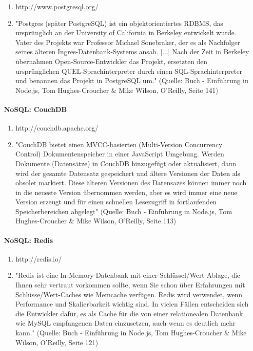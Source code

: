 \begin{enumerate}
\item http://www.postgresql.org/
\item "Postgres (sp\"ater PostgreSQL) ist ein objektorientiertes RDBMS, das urspr\"unglich an der University of California in Berkeley entwickelt wurde. Vater des Projekts war Professor Michael Sonebraker, der es als Nachfolger seines \"alteren Ingres-Datenbank-Systems ansah. [...] Nach der Zeit in Berkeley übernahmen Open-Source-Entwickler das Projekt, ersetzten den ursprünglichen QUEL-Sprachinterpreter durch einen SQL-Sprachinterpreter und benannen das Projekt in PostgreSQL um." \cite{hughes2012einfuhrung} (Quelle: Buch - Einf\"uhrung in Node.js, Tom Hughes-Croucher \& Mike Wilson, O'Reilly, Seite 141)
\end{enumerate}


\paragraph{NoSQL: CouchDB}

\begin{enumerate}
\item http://couchdb.apache.org/
\item "CouchDB bietet einen MVCC-basierten (Multi-Version Concurrency Control) Dokumentenspeicher in einer JavaScript Umgebung. Werden Dokumente (Datens\"atze) in CouchDB hinzugef\"ugt oder aktualisiert, dann wird der gesamte Datensatz gespeichert und \"altere Versionen der Daten als obsolet markiert. Diese \"alteren Versionen des Datensazes k\"onnen immer noch in die neueste Version \"ubernommen werden, aber es wird immer eine neue Version erzeugt und f\"ur einen schnellen Lesezugriff in fortlaufenden Speicherbereichen abgelegt" \cite{hughes2012einfuhrung} (Quelle: Buch - Einf\"uhrung in Node.js, Tom Hughes-Croucher \& Mike Wilson, O'Reilly, Seite 113)
\end{enumerate}

\paragraph{NoSQL: Redis}

\begin{enumerate}
\item http://redis.io/
\item "Redis ist eine In-Memory-Datenbank mit einer Schl\"ussel/Wert-Ablage, die Ihnen sehr vertraut vorkommen sollte, wenn Sie schon \"uber Erfahrungen mit Schl\"usse/Wert-Caches wie Memcache verf\"ugen. Redis wird verwendet, wenn Performance und Skalierbarkeit wichtig sind. In vielen F\"allen entscheiden sich die Entwickler daf\"ur, es als Cache f\"ur die von einer relationealen Datenbank wie MySQL empfangenen Daten einzusetzen, auch wenn es deutlich mehr kann." \cite{hughes2012einfuhrung} (Quelle: Buch - Einf\"uhrung in Node.js, Tom Hughes-Croucher \& Mike Wilson, O'Reilly, Seite 121)
\end{enumerate}

